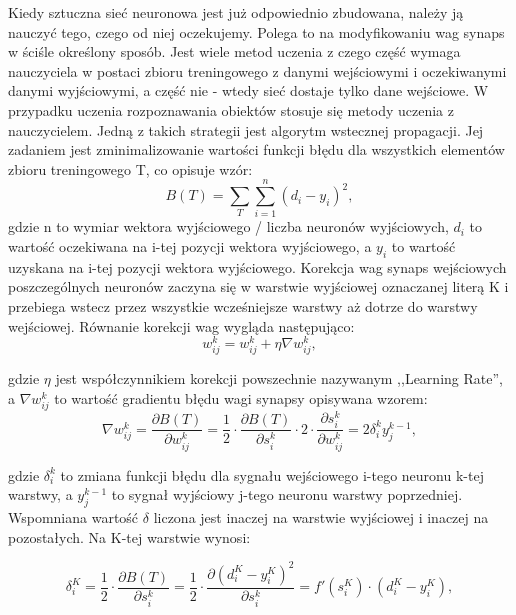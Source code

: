 \documentclass[12pt,a4paper]{article}
\begin{document}
    Kiedy sztuczna sieć neuronowa jest już odpowiednio zbudowana, należy ją nauczyć tego, czego od niej oczekujemy. Polega to na modyfikowaniu wag synaps w ściśle określony sposób. Jest wiele metod uczenia z czego część wymaga nauczyciela w postaci zbioru treningowego z danymi wejściowymi i oczekiwanymi danymi wyjściowymi, a część nie - wtedy sieć dostaje tylko dane wejściowe. W przypadku uczenia rozpoznawania obiektów stosuje się metody uczenia z nauczycielem. Jedną z takich strategii jest algorytm wstecznej propagacji. Jej zadaniem jest zminimalizowanie wartości funkcji błędu dla wszystkich elementów zbioru treningowego T, co opisuje wzór:
    \begin{equation*}
        B(T) = \sum_{T}\sum_{i=1}^{n}(d_{i} - y_{i})^{2},
    \end{equation*}
    gdzie n to wymiar wektora wyjściowego / liczba neuronów wyjściowych, $d_{i}$ to wartość oczekiwana na i-tej pozycji wektora wyjściowego, a $y_{i}$ to wartość uzyskana na i-tej pozycji wektora wyjściowego. Korekcja wag synaps wejściowych poszczególnych neuronów zaczyna się w warstwie wyjściowej oznaczanej literą K i przebiega wstecz przez wszystkie wcześniejsze warstwy aż dotrze do warstwy wejściowej. Równanie korekcji wag wygląda następująco:
    \begin{equation*}
        w^k_{ij} = w^k_{ij} + \eta \nabla w^k_{ij},
    \end{equation*}
    
    \noindent gdzie $\eta$ jest współczynnikiem korekcji powszechnie nazywanym ,,Learning Rate'', a $\nabla w^k_{ij}$ to wartość gradientu błędu wagi synapsy opisywana wzorem:
    \begin{equation*}
        \nabla w^k_{ij} = \frac{\partial B(T)}{\partial w^k_{ij}} = \frac{1}{2} \cdot \frac{\partial B(T)}{\partial s^k_i} \cdot 2 \cdot \frac{\partial s^k_i}{\partial w^k_{ij}} = 2 \delta^k_i y^{k-1}_j,
    \end{equation*}
    
    \noindent gdzie $\delta^k_i$ to zmiana funkcji błędu dla sygnału wejściowego i-tego neuronu k-tej warstwy, a $y^{k-1}_j$ to sygnał wyjściowy j-tego neuronu warstwy poprzedniej. Wspomniana wartość $\delta$ liczona jest inaczej na warstwie wyjściowej i inaczej na pozostałych. Na K-tej warstwie wynosi:
    
    \begin{equation*}
        \delta^K_i = \frac{1}{2} \cdot \frac{\partial B(T)}{\partial s^k_i} = \frac{1}{2} \cdot \frac{\partial (d^K_{i} - y^K_{i})^2}{\partial s^k_i} = f'(s^K_i) \cdot (d^K_{i} - y^K_{i}),
    \end{equation*}
    
\end{document}
